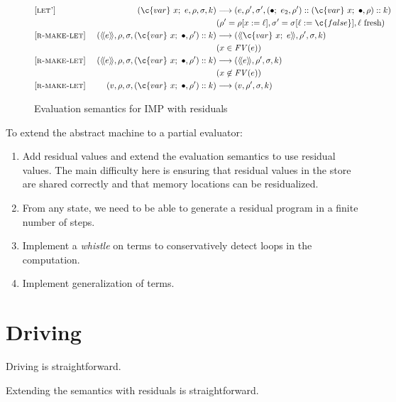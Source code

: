 \begin{figure*}
\begin{center}
\begin{align*}
\\
  \omit [\textsc{let'}] &&
    (\c{var}~x;~e, \rho, \sigma, k)
    & \longrightarrow
    (e, \rho', \sigma', \then{e_2}{\rho'}::(\c{var}~x;~\bullet, \rho)::k) 
        \\ &&& (\rho' = \rho[x := \ell], \sigma' = \sigma[\ell := \c{false}], \ell~\mbox{fresh})
\\
  \omit [\textsc{r-make-let}] &&
    (\residual{e}, \rho, \sigma, (\c{var}~x;~\bullet, \rho')::k)
    & \longrightarrow
    (\residual{\c{var}~x;~e}, \rho', \sigma, k) 
        \\ &&& (x \in \mathit{FV}(e))
\\
  \omit [\textsc{r-make-let}] &&
    (\residual{e}, \rho, \sigma, (\c{var}~x;~\bullet, \rho')::k)
    & \longrightarrow
    (\residual{e}, \rho', \sigma, k) 
        \\ &&& (x \not\in \mathit{FV}(e))
\\
  \omit [\textsc{r-make-let}] &&
    (v, \rho, \sigma, (\c{var}~x;~\bullet, \rho')::k)
    & \longrightarrow
    (v, \rho', \sigma, k) 
\\
\end{align*}
  \end{center}

\caption{Evaluation semantics for IMP with residuals}
\label{fig:imp-cesk-res}
\end{figure*}
    
To extend the abstract machine to a partial evaluator:
\begin{enumerate}
\item Add residual values and extend the evaluation semantics
to use residual values.
The main difficulty here is ensuring that residual values in the store
are shared correctly and that memory locations can be residualized.
\item From any state, we need to be able to generate a residual program
in a finite number of steps.
\item Implement a \emph{whistle} on terms to conservatively detect
loops in the computation.
\item Implement generalization of terms.
\end{enumerate}

\section{Driving}

Driving is straightforward.

Extending the semantics with residuals is straightforward.

